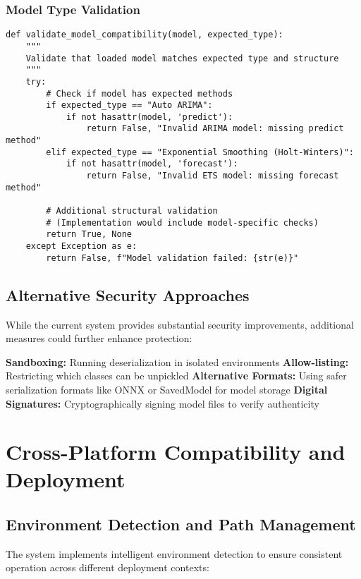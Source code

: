 \subsubsection{Model Type Validation}

\begin{lstlisting}[language=MyPython, caption={Model Type and Content Validation}]
def validate_model_compatibility(model, expected_type):
    """
    Validate that loaded model matches expected type and structure
    """
    try:
        # Check if model has expected methods
        if expected_type == "Auto ARIMA":
            if not hasattr(model, 'predict'):
                return False, "Invalid ARIMA model: missing predict method"
        elif expected_type == "Exponential Smoothing (Holt-Winters)":
            if not hasattr(model, 'forecast'):
                return False, "Invalid ETS model: missing forecast method"
        
        # Additional structural validation
        # (Implementation would include model-specific checks)
        return True, None
    except Exception as e:
        return False, f"Model validation failed: {str(e)}"
\end{lstlisting}

\subsection{Alternative Security Approaches}

While the current system provides substantial security improvements, additional measures could further enhance protection:

\textbf{Sandboxing:} Running deserialization in isolated environments
\textbf{Allow-listing:} Restricting which classes can be unpickled
\textbf{Alternative Formats:} Using safer serialization formats like ONNX or SavedModel for model storage
\textbf{Digital Signatures:} Cryptographically signing model files to verify authenticity

\section{Cross-Platform Compatibility and Deployment}

\subsection{Environment Detection and Path Management}

The system implements intelligent environment detection to ensure consistent operation across different deployment contexts:

